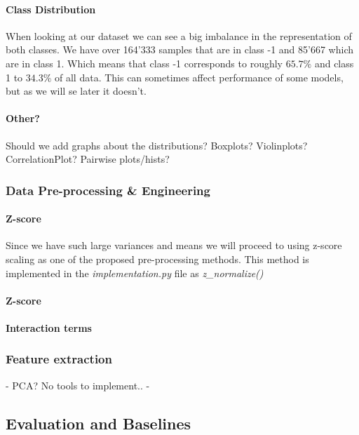 \documentclass[sigconf, nonacm]{acmart}
\begin{document}
\paragraph{Class Distribution} When looking at our dataset we can see a big imbalance in the representation of both classes. We have over 164'333 samples that are in class -1 and 85'667 which are in class 1. Which means that class -1 corresponds to roughly $65.7\%$ and class 1 to $34.3\%$ of all data. This can sometimes affect performance of some models, but as we will se later it doesn't. \\
\paragraph{Other?} Should we add graphs about the distributions? Boxplots? Violinplots? CorrelationPlot? Pairwise plots/hists?

\subsubsection{Data Pre-processing \& Engineering}
\paragraph*{}
\paragraph{Z-score} Since we have such large variances and means we will proceed to using z-score scaling as one of the proposed pre-processing methods. This method is implemented in the \textit{implementation.py} file as  \textit{z\_normalize()}
\paragraph{}
\paragraph{Z-score}
\paragraph{Interaction terms}
\subsubsection{Feature extraction} %
- PCA? No tools to implement..
- 

\subsection{Evaluation and Baselines}
\end{document}
